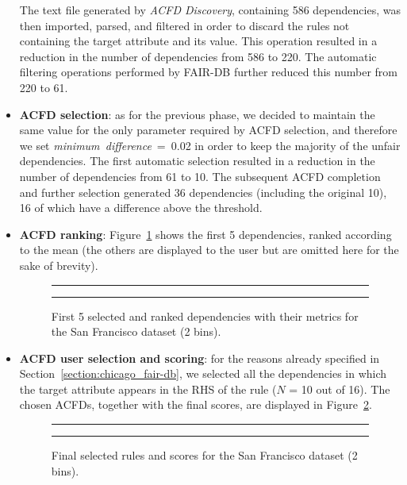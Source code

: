 \begin{itemize}
The text file generated by \textit{ACFD Discovery}, containing 586 dependencies, was then imported, parsed, and filtered in order to discard the rules not containing the target attribute and its value. This operation resulted in a reduction in the number of dependencies from 586 to 220. The automatic filtering operations performed by FAIR-DB further reduced this number from 220 to 61.
\item \textbf{ACFD selection}: as for the previous phase, we decided to maintain the same value for the only parameter required by ACFD selection, and therefore we set \textit{minimum~difference}~=~0.02 in order to keep the majority of the unfair dependencies. The first automatic selection resulted in a reduction in the number of dependencies from 61 to 10. The subsequent ACFD completion and further selection generated 36 dependencies (including the original 10), 16 of which have a difference above the threshold.
\item \textbf{ACFD ranking}: Figure~\ref{fig:san_francisco_fair-db2} shows the first 5 dependencies, ranked according to the mean (the others are displayed to the user but are omitted here for the sake of brevity).

\begin{figure}[t!]
\centering
\noindent\rule{\linewidth}{0.4pt}\par
\noindent\rule{\linewidth}{0.4pt}
\caption{First 5 selected and ranked dependencies with their metrics for the San Francisco dataset (2 bins).}
\label{fig:san_francisco_fair-db2}
\end{figure}

\item \textbf{ACFD user selection and scoring}: for the reasons already specified in Section~\ref{section:chicago_fair-db}, we selected all the dependencies in which the target attribute appears in the RHS of the rule (\(N\) = 10 out of 16). The chosen ACFDs, together with the final scores, are displayed in Figure~\ref{fig:san_francisco_fair-db3}.

\begin{figure}[t!]
\centering
\noindent\rule{\linewidth}{0.4pt}\par
\noindent\rule{\linewidth}{0.4pt}
\caption{Final selected rules and scores for the San Francisco dataset (2 bins).}
\label{fig:san_francisco_fair-db3}
\end{figure}
\end{itemize}

